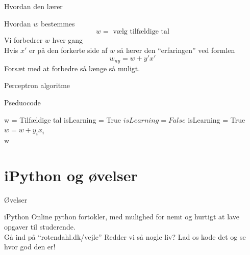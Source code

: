 \documentclass[12pt,t]{beamer}
\begin{document}
    \begin{frame}[c]{Hvordan den lærer}
        \begin{block}{Hvordan $w$ bestemmes}
            $$w = \text{ vælg tilfældige tal}$$
            \pause
            Vi forbedrer $w$ hver gang\\ \pause
            Hvis $x'$ er på den forkerte side af $w$ så lærer den ``erfaringen''
            ved formlen \pause
            $$
                w_{ny} = w + y' x'
            $$
            \pause
            Forsæt med at forbedre så længe så muligt.
        \end{block}
    \end{frame}


    \begin{frame}[plain]{Perceptron algoritme}
        \begin{block}{Pseduocode}
        \vspace{-1em}
        \begin{algorithm}[H]
            \begin{algorithmic}
                \State w = Tilfældige tal
                \State isLearning = True
                \State $isLearning = False$
                        \State isLearning = True
                        \State $w = w + y_i x_i$
                    \EndIf
                \EndFor
                \EndWhile \\
                \Return w
            \end{algorithmic}
        \end{algorithm}
        \end{block}
    \end{frame}

\section{iPython og øvelser}
    \begin{frame}[t]{Øvelser}
        \begin{block}{iPython}
            Online python fortokler, med mulighed for nemt og hurtigt at lave
            opgaver til studerende. \\

            Gå ind på ``rotendahl.dk/vejle''
                \pause
                Redder vi så nogle liv?
                \pause
                Lad os kode det og se hvor god den er!
            \end{block}
    \end{frame}
\end{document}
